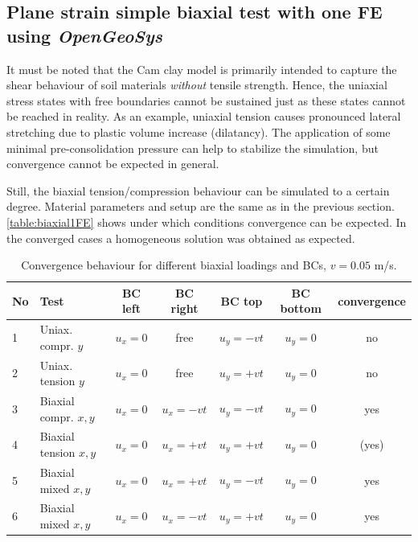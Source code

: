 \documentclass[paper=a4, twoside, pagesize]{scrartcl}
\begin{document}
\subsection{Plane strain simple biaxial test with one FE using \textsl{OpenGeoSys}}

It must be noted that the Cam clay model is primarily intended to capture the shear behaviour of soil materials \emph{without} tensile strength. Hence, the uniaxial stress states with free boundaries cannot be sustained just as these states cannot be reached in reality. As an example, uniaxial tension causes pronounced lateral stretching due to plastic volume increase (dilatancy). The application of some minimal pre-consolidation pressure can help to stabilize the simulation, but convergence cannot be expected in general.
\par
Still, the biaxial tension/compression behaviour can be simulated to a certain degree. Material parameters and setup are the same as in the previous section. \autoref{table:biaxial1FE} shows under which conditions convergence can be expected. In the converged cases a homogeneous solution was obtained as expected.

\begin{table}[h!]
  \begin{tabular}{l|l|c|c|c|c|c}
     No & Test                    & BC left   & BC right      & BC top               & BC bottom   & convergence\\
     \hline
     1 & Uniax. compr. $y$       & $u_x=0$   & free       & $u_y=-v t$         & $u_y=0$     & no\\
     2 & Uniax. tension $y$      & $u_x=0$   & free       & $u_y=+v t$         & $u_y=0$     & no\\
     3 & Biaxial compr. $x,y$    & $u_x=0$   & $u_x=-v t$ & $u_y=-v t$         & $u_y=0$     & yes\\
     4 & Biaxial tension $x,y$   & $u_x=0$   & $u_x=+v t$ & $u_y=+v t$         & $u_y=0$     & (yes)\\
     5 & Biaxial mixed $x,y$     & $u_x=0$   & $u_x=+v t$ & $u_y=-v t$         & $u_y=0$     & yes\\
     6 & Biaxial mixed $x,y$     & $u_x=0$   & $u_x=-v t$ & $u_y=+v t$         & $u_y=0$     & yes\\
     \hline 
  \end{tabular}
  \caption{Convergence behaviour for different biaxial loadings and BCs, $v=0.05$ m/s.}\label{table:biaxial1FE}
\end{table}
\end{document}
